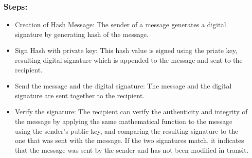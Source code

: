 \subsubsection{Steps:}
\begin{itemize}
	\item Creation of Hash Message: The sender of a message generates a digital signature by generating hash of the message.
	\item Sign Hash with private key: This hash value is signed using the priate key, resulting digital signature which is appended to the message and sent to the
	      recipient.
	\item Send the message and the digital signature: The message and the digital signature are sent together to the recipient.
	\item Verify the signature: The recipient can verify the authenticity and integrity of the message by applying the same
	      mathematical function to the message using the sender's public key, and comparing the resulting signature to the one that was sent with the message.
	      If the two signatures match, it indicates that the message was sent by the sender and has not been modified in transit.
\end{itemize}
